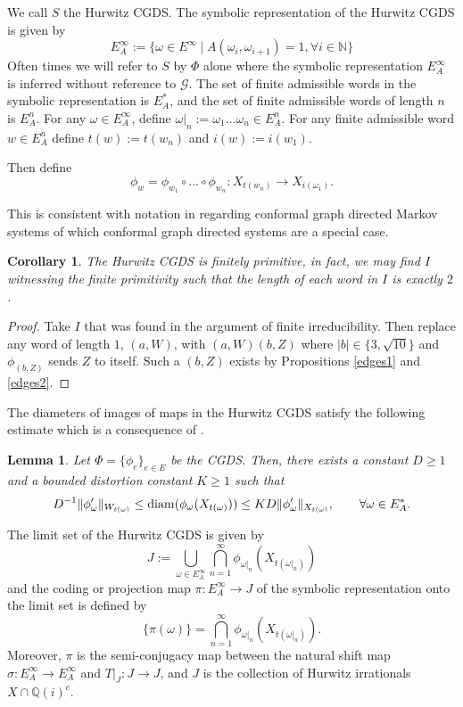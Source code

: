 \documentclass[11pt]{amsart}
\theoremstyle{plain}
\newtheorem{corollary}[theorem]{Corollary}
\newtheorem{lemma}[theorem]{Lemma}
\theoremstyle{definition}
\renewcommand\~{\tilde}%
\newcommand{\om}{\ensuremath{\omega}}
\newcommand{\cG}{\ensuremath{\mathcal{G}}}
\newcommand{\NN}{\ensuremath{\mathbb N}}%
\newcommand{\QQ}{\ensuremath{\mathbb Q}}%
\numberwithin{equation}{section}
\begin{document}
We call $S$ the Hurwitz CGDS. The symbolic representation of the Hurwitz CGDS is given by
$$
    E_{A}^{\infty}:= \{\om\in E^{\infty}\:|\; A(\om_i,\om_{i+1}) = 1, \forall i\in \NN\}
$$
Often times we will refer to $S$ by $\Phi$ alone where the symbolic representation $E_A^{\infty}$ is inferred without reference to $\cG$. The set of finite admissible words in the symbolic representation is $E_A^{*}$, and the set of finite admissible words of length $n$ is $E_A^{n}$. For any $\om\in E_A^{\infty}$, define $\om\vert_n:=\om_1\dots\om_n\in E_A^n$. For any finite admissible word $w\in E_A^n$ define $t(w) := t(w_n)$ and $i(w) := i(w_1)$. 

Then define
$$\phi_{w} = \phi_{w_1}\circ \dots \circ \phi_{w_n}:X_{t(w_n)}\to X_{i(\om_1)}.
$$

This is consistent with notation in \cite{Urbanski22} regarding conformal graph directed Markov systems of which conformal graph directed systems are a special case. 

\begin{corollary}
    The Hurwitz CGDS is finitely primitive, in fact, we may find $I$ witnessing the finite primitivity such that the length of each word in $I$ is exactly $2$.
\end{corollary}

\begin{proof}
    Take $I$ that was found in the argument of finite irreducibility. Then replace any word of length $1$, $(a,W)$, with $(a,W)(b,Z)$ where $|b|\in\{3, \sqrt{10}\}$ and $\phi_{(b,Z)}$ sends $Z$ to itself. Such a $(b,Z)$ exists by Propositions \ref{edges1} and \ref{edges2}.
\end{proof}

The diameters of images of maps in the Hurwitz CGDS satisfy the following estimate which is a consequence of \cite[Lemmas 19.3.9 and 19.3.11]{Urbanski22}.
    \begin{lemma}\label{lem:diam1}
        Let $\Phi = \{\phi_e\}_{e\in E}$ be the CGDS. Then, there exists a constant $D\geq 1$ and a bounded distortion constant $K\geq 1$ such that 
        $$
            D^{-1}\|\phi_{\om}'\|_{W_{t(\om)}}\leq {\rm diam}(\phi_{\om}(X_{t(\om)}))\leq KD\|\phi_{\om}'\|_{X_{t(\om)}}, \qquad \forall \om\in E_{A}^{*}.
        $$
    \end{lemma}

The limit set of the Hurwitz CGDS is given by 
$$
    J := \bigcup_{\om\in E_A^{\infty}}\bigcap_{n=1}^{\infty}\phi_{\om|_n}(X_{t(\om|_n)})
$$
and the coding or projection map $\pi:E_A^{\infty}\to J$ of the symbolic representation onto the limit set is defined by
$$
    \{\pi(\om)\} = \bigcap_{n=1}^{\infty}\phi_{\om|_n}(X_{t(\om|_n)}).
$$
Moreover, $\pi$ is the semi-conjugacy map between the natural shift map $\sigma: E_A^{\infty}\to E_A^{\infty}$ and $T\vert_J:J\to J$, and $J$ is the collection of Hurwitz irrationals $X\cap \QQ(i)^c$. 
\end{document}
